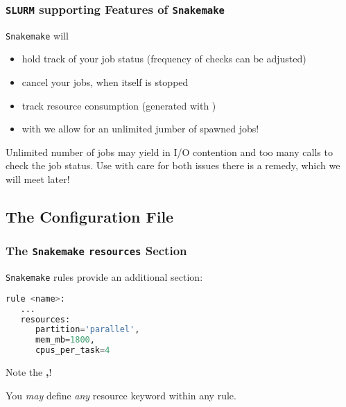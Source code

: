 \begin{frame}[fragile]
  \frametitle{\texttt{SLURM} supporting Features of \texttt{Snakemake}}
  \texttt{Snakemake} will
  \begin{itemize}[<+->]
   \item hold track of your job status (frequency of checks can be adjusted)
   \item cancel your jobs, when itself is stopped
   \item track resource consumption (generated with )
   \item with  we allow for an unlimited jumber of spawned jobs!
  \end{itemize}
  \pause
  \begin{warning}
  	Unlimited number of jobs may yield in I/O contention and too many calls to check the job status. Use with care for both issues there is a remedy, which we will meet later!
  \end{warning}
\end{frame}

\subsection{The Configuration File}

\begin{frame}[fragile]
  \frametitle{The \texttt{Snakemake} \texttt{resources} Section}
  \texttt{Snakemake} rules provide an additional  section:
  \begin{lstlisting}[language=Python,style=Python]
rule <name>:
   ...
   resources:
      partition='parallel',
      mem_mb=1800,
      cpus_per_task=4
  \end{lstlisting}
  \begin{hint}
  	Note the \textbf{,}!
  \end{hint}
  \pause
  \begin{docs}
  	You \emph{may} define \emph{any} resource keyword within any rule.
  \end{docs}
\end{frame}

